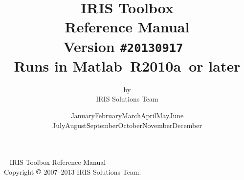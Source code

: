 \documentclass[letterpaper,fleqn,10pt]{article}
\newcommand{\mycmss}{\fontfamily{lcmss}\selectfont}
\newcommand\Today{\number\day\space \ifcase\month\or
  January\or February\or March\or April\or May\or June\or
  July\or August\or September\or October\or November\or December\fi
  \space\number\year}
\newcommand{\irisversion}{20130917}
\newcommand{\matlabversion}{R2010a}
\begin{document}
\thispagestyle{empty}
\title{\vspace*{0.2\textheight}\huge\mdseries IRIS Toolbox\\Reference Manual \\[24pt] \rmfamily \large \mdseries Version \texttt{\#\irisversion}\ \\[6pt]
Runs in Matlab\raisebox{5pt}{\tiny $\copyright$}\ \matlabversion\ or later}
\author{by \\[2pt] IRIS Solutions Team}
\date{\bigskip\bigskip \Today\\[5pt]}
\maketitle
\thispagestyle{empty}
\clearpage

~
\vfill
IRIS Toolbox Reference Manual \\
Copyright $\copyright$ 2007--2013 IRIS Solutions Team.
\thispagestyle{empty}



\clearpage


\clearpage
{}
\tableofcontents
\clearpage




\end{document}
